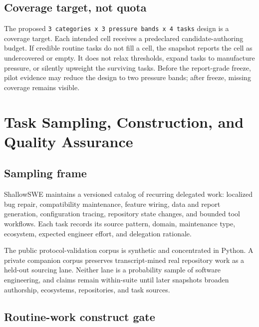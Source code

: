 \documentclass[11pt]{article}
\begin{document}
\subsection{Coverage target, not quota}\hypertarget{45-coverage-target-not-quota}{}\label{45-coverage-target-not-quota}

The proposed \texttt{3 categories x 3 pressure bands x 4 tasks} design is a coverage target. Each intended cell receives a predeclared candidate-authoring budget. If credible routine tasks do not fill a cell, the snapshot reports the cell as undercovered or empty. It does not relax thresholds, expand tasks to manufacture pressure, or silently upweight the surviving tasks. Before the report-grade freeze, pilot evidence may reduce the design to two pressure bands; after freeze, missing coverage remains visible.

\section{Task Sampling, Construction, and Quality Assurance}\hypertarget{5-task-sampling-construction-and-quality-assurance}{}\label{5-task-sampling-construction-and-quality-assurance}

\subsection{Sampling frame}\hypertarget{51-sampling-frame}{}\label{51-sampling-frame}

ShallowSWE maintains a versioned catalog of recurring delegated work: localized bug repair, compatibility maintenance, feature wiring, data and report generation, configuration tracing, repository state changes, and bounded tool workflows. Each task records its source pattern, domain, maintenance type, ecosystem, expected engineer effort, and delegation rationale.

The public protocol-validation corpus is synthetic and concentrated in Python. A private companion corpus preserves transcript-mined real repository work as a held-out sourcing lane. Neither lane is a probability sample of software engineering, and claims remain within-suite until later snapshots broaden authorship, ecosystems, repositories, and task sources.

\subsection{Routine-work construct gate}\hypertarget{52-routine-work-construct-gate}{}\label{52-routine-work-construct-gate}
\end{document}
